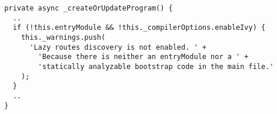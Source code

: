 \begin{verbatim}
  private async _createOrUpdateProgram() {
    ..
    if (!this.entryModule && !this._compilerOptions.enableIvy) {
      this._warnings.push(
        'Lazy routes discovery is not enabled. ' +
          'Because there is neither an entryModule nor a ' +
          'statically analyzable bootstrap code in the main file.'
      );
    }
    ..
  }
\end{verbatim}
